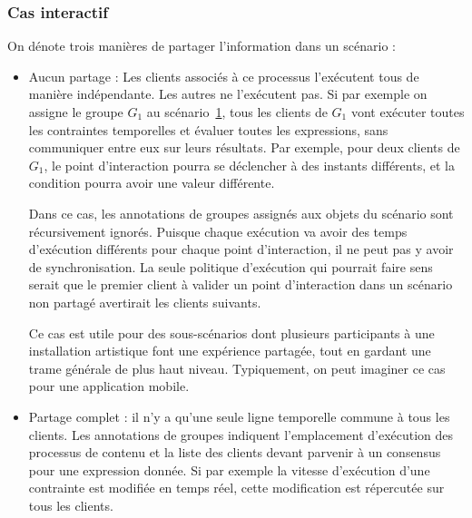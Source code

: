 \documentclass[10pt]{article}
\newcommand\trigger{point d'interaction\xspace}
\begin{document}
\subsubsection{Cas interactif}
On dénote trois manières de partager l'information dans un scénario : 

\begin{itemize}
    \item Aucun partage : Les clients associés à ce processus l'exécutent tous de manière indépendante.
    Les autres ne l'exécutent pas. 
    Si par exemple on assigne le groupe $G_1$ au scénario~\ref{scenar.general}, tous les clients de $G_1$ vont exécuter toutes les contraintes temporelles et évaluer toutes les expressions, sans communiquer entre eux sur leurs résultats. 
    Par exemple, pour deux clients de $G_1$, le \trigger pourra se déclencher à des instants différents, et la condition pourra avoir une valeur différente.
    
    Dans ce cas, les annotations de groupes assignés aux objets du scénario sont récursivement ignorés. 
    Puisque chaque exécution va avoir des temps d'exécution différents pour chaque point d'interaction, il ne peut pas y avoir de synchronisation.
    La seule politique d'exécution qui pourrait faire sens serait que le premier client à valider un \trigger dans un scénario non partagé avertirait les clients suivants.
    
    Ce cas est utile pour des sous-scénarios dont plusieurs participants à une installation artistique font une expérience partagée, tout en gardant une trame générale de plus haut niveau. 
    Typiquement, on peut imaginer ce cas pour une application mobile.
    
    \begin{figure}[h]
        \centering
        \begin{tikzpicture}
        
        \end{tikzpicture}
        \label{scenar.general}
    \end{figure}
    
    \item Partage complet : il n'y a qu'une seule ligne temporelle commune à tous les clients. 
    Les annotations de groupes indiquent l'emplacement d'exécution des processus de contenu et la liste des clients devant parvenir à un consensus pour une expression donnée. 
    Si par exemple la vitesse d'exécution d'une contrainte est modifiée en temps réel, cette modification est répercutée sur tous les clients.
    

\end{itemize}
\end{document}
